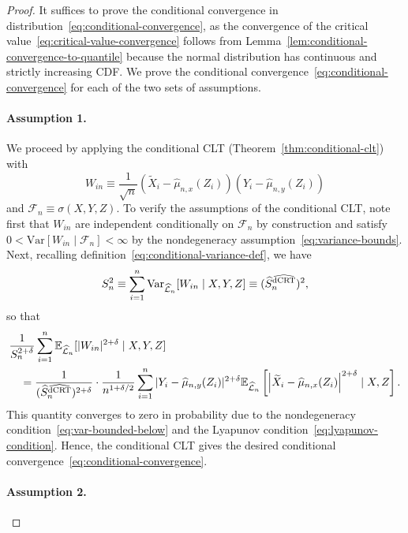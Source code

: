 \documentclass[12pt]{article}
\theoremstyle{definition}
\theoremstyle{remark}
\newcommand{\E}{\mathbb E}								%
\newcommand{\V}{\mathrm{Var}}							%
\newcommand{\srx}{X}									%
\newcommand{\srz}{Z}									%
\newcommand{\srxk}{\widetilde X}						%
\newcommand{\sry}{Y}									%
\newcommand{\lawhat}{\widehat{\mathcal L}}				%
\newcommand{\dCRThat}{\widehat{\textnormal{dCRT}}}		%
\begin{document}
\begin{proof}

It suffices to prove the conditional convergence in distribution~\eqref{eq:conditional-convergence}, as the convergence of the critical value~\eqref{eq:critical-value-convergence} follows from Lemma~\ref{lem:conditional-convergence-to-quantile} because the normal distribution has continuous and strictly increasing CDF. We prove the conditional convergence~\eqref{eq:conditional-convergence} for each of the two sets of assumptions.

\paragraph{Assumption 1.}

We proceed by applying the conditional CLT (Theorem~\ref{thm:conditional-clt}) with 
\begin{equation}
W_{in} \equiv \frac{1}{\sqrt{n}}(\srxk_i - \widehat \mu_{n,x}(\srz_i))(\sry_i - \widehat \mu_{n,y}(\srz_i))
\end{equation}
and $\mathcal F_n \equiv \sigma(\srx, \sry, \srz)$. To verify the assumptions of the conditional CLT, note first that $W_{in}$ are independent conditionally on $\mathcal F_n$ by construction and satisfy $0 < \V[W_{in} \mid \mathcal F_n] < \infty$ by the nondegeneracy assumption~\eqref{eq:variance-bounds}. Next, recalling definition~\eqref{eq:conditional-variance-def}, we have
\begin{equation*}
S^2_n \equiv \sum_{i = 1}^n \V_{\lawhat_n}[W_{in}\mid \srx,\sry,\srz] \equiv (\widehat S_n^{\dCRThat})^2,
\end{equation*}
so that
\begin{align*}
		&\frac{1}{S_n^{2+\delta}} \sum_{i = 1}^n \E_{\lawhat_n}[|W_{in}|^{2+\delta} \mid \srx,\sry,\srz] \\
		&\quad= \frac{1}{(\widehat S_n^{\dCRThat})^{2+\delta}} \cdot \frac{1}{n^{1+\delta/2}} \sum_{i=1}^n |\sry_i-\widehat\mu_{n,y}(\srz_i)|^{2+\delta}\E_{\lawhat_n}\left[\left|\srxk_i-\widehat\mu_{n,x}(\srz_i)\right|^{2+\delta}\mid \srx,\srz\right].
\end{align*}
This quantity converges to zero in probability due to the nondegeneracy condition~\eqref{eq:var-bounded-below} and the Lyapunov condition~\eqref{eq:lyapunov-condition}. Hence, the conditional CLT gives the desired conditional convergence~\eqref{eq:conditional-convergence}.
 
 \paragraph{Assumption 2.}


\end{proof}
\end{document}
